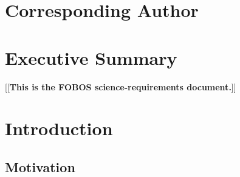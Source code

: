 \documentclass[11pt,a4paper,twoside,onecolumn,openany,final,oldfontcommands]{memoir}
\newcommand{\edit}[2][todo]{{\color{#1}[[{\bf #2}]]}}
\begin{document}
%
%


\frontmatter

\thispagestyle{empty}  %

\clearpage
\setupmaintoc
\tableofcontents 

\clearpage
\listoffigures

\clearpage
\listoftables

\chapter{Corresponding Author}
%



\chapter{Executive Summary}

\edit{This is the FOBOS science-requirements document.}



\mainmatter

\chapter{Introduction}

\section{Motivation}
\end{document}
